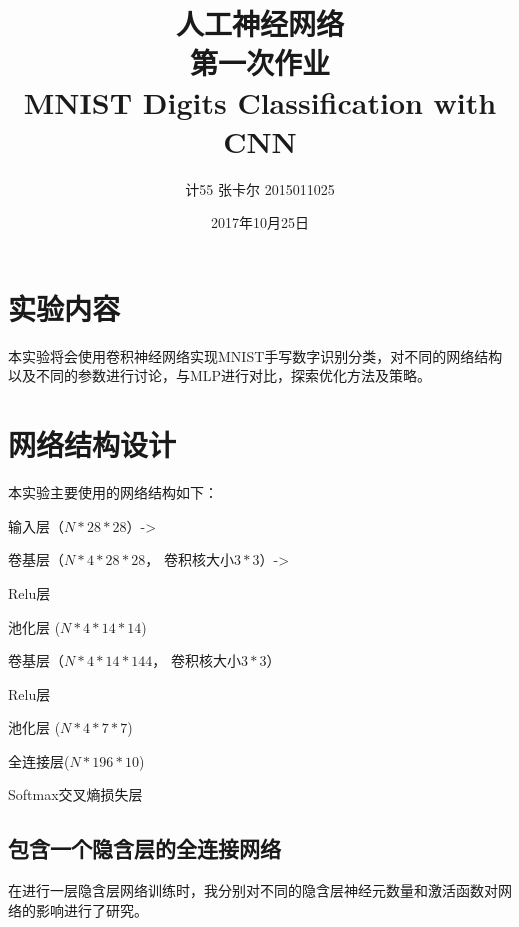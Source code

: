 \documentclass[11pt,utf8]{article}
\begin{document}
    
    \let\enumerate\compactenum
    \let\endenumerate\endcompactenum
    \let\itemize\compactitem
    \let\enditemize\endcompactitem
    \setlength{\pltopsep}{5pt}
    \setlength{\parindent}{2em}
    \setlength{\footskip}{30pt}
    \setlength{\baselineskip}{1.3\baselineskip}
    \renewcommand\arraystretch{1.2}
    
    
    \title{人工神经网络\\第一次作业\\MNIST Digits Classification with CNN}
    \date{2017年10月25日}
    \author{计55 张卡尔 2015011025}
      \maketitle
      \section*{实验内容}
        \indent 本实验将会使用卷积神经网络实现MNIST手写数字识别分类，对不同的网络结构以及不同的参数进行讨论，与MLP进行对比，探索优化方法及策略。\\
      \section*{网络结构设计}
        本实验主要使用的网络结构如下：
        \begin{itemize}
          \item 输入层（$N*28*28$）->
          \item 卷基层（$N*4*28*28$， 卷积核大小$3*3$）->
          \item Relu层
          \item 池化层 ($N*4*14*14$)
          \item 卷基层（$N*4*14*144$， 卷积核大小$3*3$）
          \item Relu层
          \item 池化层 ($N*4*7*7$)
          \item 全连接层($N*196*10$)
          \item Softmax交叉熵损失层
        \end{itemize}
        \subsection*{包含一个隐含层的全连接网络}
          \indent 在进行一层隐含层网络训练时，我分别对不同的隐含层神经元数量和激活函数对网络的影响进行了研究。\\
\end{document}
